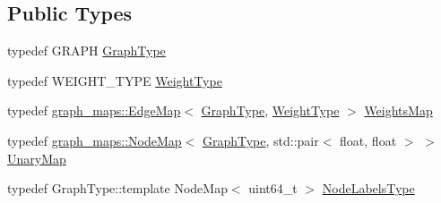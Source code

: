 \subsection*{Public Types}
\begin{DoxyCompactItemize}
\item 
typedef G\+R\+A\+PH \hyperlink{classnifty_1_1graph_1_1opt_1_1minstcut_1_1MinstcutObjective_a8d416ff18d747ac8ac242dde0e1406c0}{Graph\+Type}
\item 
typedef W\+E\+I\+G\+H\+T\+\_\+\+T\+Y\+PE \hyperlink{classnifty_1_1graph_1_1opt_1_1minstcut_1_1MinstcutObjective_a673518e95b6f21213996c12dea91d72b}{Weight\+Type}
\item 
typedef \hyperlink{structnifty_1_1graph_1_1graph__maps_1_1EdgeMap}{graph\+\_\+maps\+::\+Edge\+Map}$<$ \hyperlink{classnifty_1_1graph_1_1opt_1_1minstcut_1_1MinstcutObjective_a8d416ff18d747ac8ac242dde0e1406c0}{Graph\+Type}, \hyperlink{classnifty_1_1graph_1_1opt_1_1minstcut_1_1MinstcutObjective_a673518e95b6f21213996c12dea91d72b}{Weight\+Type} $>$ \hyperlink{classnifty_1_1graph_1_1opt_1_1minstcut_1_1MinstcutObjective_afba077d00b3dff86d2b482c1fb88344b}{Weights\+Map}
\item 
typedef \hyperlink{structnifty_1_1graph_1_1graph__maps_1_1NodeMap}{graph\+\_\+maps\+::\+Node\+Map}$<$ \hyperlink{classnifty_1_1graph_1_1opt_1_1minstcut_1_1MinstcutObjective_a8d416ff18d747ac8ac242dde0e1406c0}{Graph\+Type}, std\+::pair$<$ float, float $>$ $>$ \hyperlink{classnifty_1_1graph_1_1opt_1_1minstcut_1_1MinstcutObjective_a1662c8902f85cd5d0aa046c5657ee0f2}{Unary\+Map}
\item 
typedef Graph\+Type\+::template Node\+Map$<$ uint64\+\_\+t $>$ \hyperlink{classnifty_1_1graph_1_1opt_1_1minstcut_1_1MinstcutObjective_ac450f5d647c4c29de17ab11ecf5d8d84}{Node\+Labels\+Type}
\end{DoxyCompactItemize}
